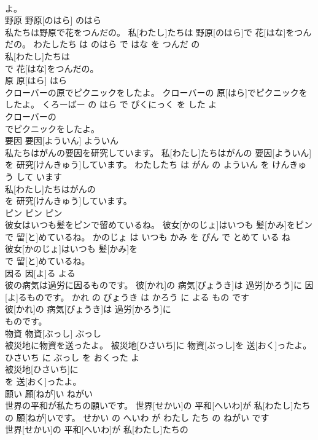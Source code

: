 \documentclass[8pt]{extreport}
\begin{document}
\begin{CJK}{UTF8}{min}
\\	よ。			
\\	野原	野原[のはら]	のはら	
\\	私たちは野原で花をつんだの。	私[わたし]たちは 野原[のはら]で 花[はな]をつんだの。	わたしたち は のはら で はな を つんだ の	
\\	私[わたし]たちは
\\	で 花[はな]をつんだの。			
\\	原	原[はら]	はら	
\\	クローバーの原でピクニックをしたよ。	クローバーの 原[はら]でピクニックをしたよ。	くろーばー の はら で ぴくにっく を した よ	
\\	クローバーの
\\	でピクニックをしたよ。			
\\	要因	要因[よういん]	よういん	
\\	私たちはがんの要因を研究しています。	私[わたし]たちはがんの 要因[よういん]を 研究[けんきゅう]しています。	わたしたち は がん の よういん を けんきゅう して います	
\\	私[わたし]たちはがんの
\\	を 研究[けんきゅう]しています。			
\\	ピン	ピン	ピン	
\\	彼女はいつも髪をピンで留めているね。	彼女[かのじょ]はいつも 髪[かみ]をピンで 留[と]めているね。	かのじょ は いつも かみ を ぴん で とめて いる ね	
\\	彼女[かのじょ]はいつも 髪[かみ]を
\\	で 留[と]めているね。			
\\	因る	因[よ]る	よる	
\\	彼の病気は過労に因るものです。	彼[かれ]の 病気[びょうき]は 過労[かろう]に 因[よ]るものです。	かれ の びょうき は かろう に よる もの です	
\\	彼[かれ]の 病気[びょうき]は 過労[かろう]に
\\	ものです。			
\\	物資	物資[ぶっし]	ぶっし	
\\	被災地に物資を送ったよ。	被災地[ひさいち]に 物資[ぶっし]を 送[おく]ったよ。	ひさいち に ぶっし を おくった よ	
\\	被災地[ひさいち]に
\\	を 送[おく]ったよ。			
\\	願い	願[ねが]い	ねがい	
\\	世界の平和が私たちの願いです。	世界[せかい]の 平和[へいわ]が 私[わたし]たちの 願[ねが]いです。	せかい の へいわ が わたし たち の ねがい です	
\\	世界[せかい]の 平和[へいわ]が 私[わたし]たちの

\end{CJK}
\end{document}
